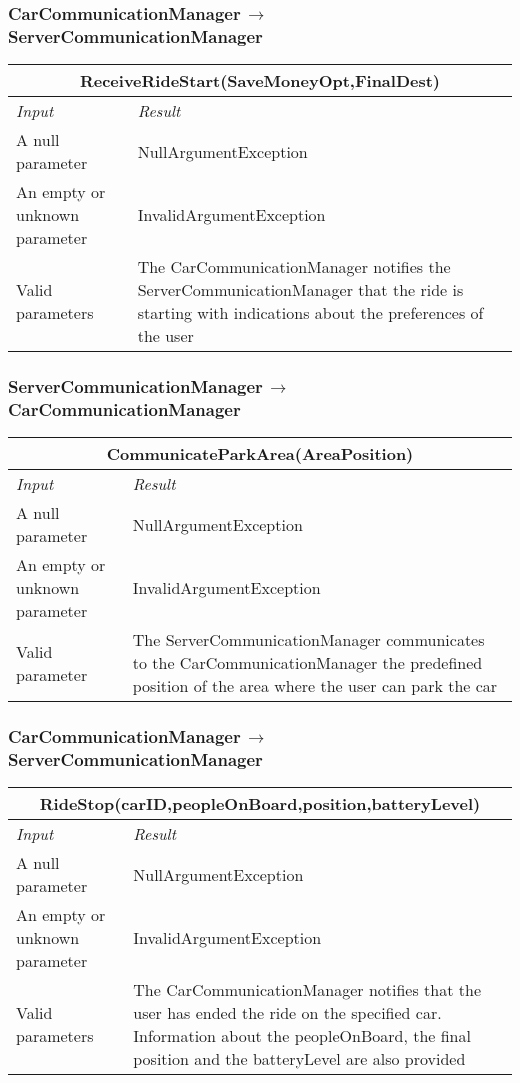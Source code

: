 \documentclass[11pt,a4paper]{report}
\begin{document}
\subsubsection{CarCommunicationManager$\,\to\,$ServerCommunicationManager}
\begin{tabularx}{\textwidth}{|X|X|}
	\hline
	\multicolumn{2}{|c|}{\textbf{ReceiveRideStart(SaveMoneyOpt,FinalDest)}}\\
	\hline
	\textit{Input} & \textit{Result}\\
	\hline
	A null parameter & NullArgumentException\\
	\hline
	An empty or unknown parameter & InvalidArgumentException\\
	\hline
	Valid parameters &  The CarCommunicationManager notifies the ServerCommunicationManager that the ride is starting with indications about the preferences of the user\\
	\hline
\end{tabularx}
\subsubsection{ServerCommunicationManager$\,\to\,$CarCommunicationManager}
\begin{tabularx}{\textwidth}{|X|X|}
	\hline
	\multicolumn{2}{|c|}{\textbf{CommunicateParkArea(AreaPosition)}}\\
	\hline
	\textit{Input} & \textit{Result}\\
	\hline
	A null parameter & NullArgumentException\\
	\hline
	An empty or unknown parameter & InvalidArgumentException\\
	\hline
	Valid parameter & The ServerCommunicationManager communicates to the CarCommunicationManager the predefined position of the area where the user can park the car\\
	\hline
\end{tabularx}
\subsubsection{CarCommunicationManager$\,\to\,$ServerCommunicationManager}
\begin{tabularx}{\textwidth}{|X|X|}
	\hline
	\multicolumn{2}{|c|}{\textbf{RideStop(carID,peopleOnBoard,position,batteryLevel)}}\\
	\hline
	\textit{Input} & \textit{Result}\\
	\hline
	A null parameter & NullArgumentException\\
	\hline
	An empty or unknown parameter & InvalidArgumentException\\
	\hline
	Valid parameters & The CarCommunicationManager notifies that the user has ended the ride on the specified car. Information about the peopleOnBoard, the final position and the batteryLevel are also provided\\
	\hline
\end{tabularx}
\end{document}
